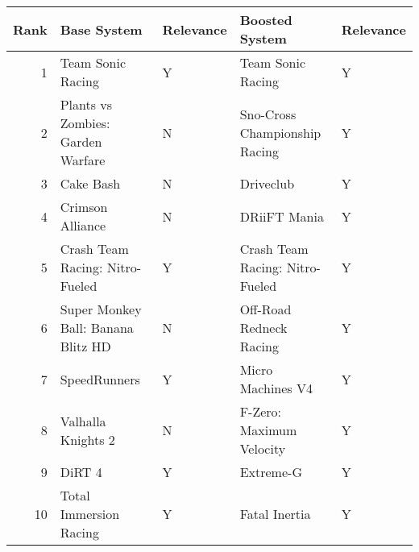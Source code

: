 \begin{tabular}{rllll}
\toprule
Rank & Base System & Relevance & Boosted System & Relevance \\
\midrule
1 & Team Sonic Racing & Y & Team Sonic Racing & Y \\
2 & Plants vs Zombies: Garden Warfare & N & Sno-Cross Championship Racing & Y \\
3 & Cake Bash & N & Driveclub & Y \\
4 & Crimson Alliance & N & DRiiFT Mania & Y \\
5 & Crash Team Racing: Nitro-Fueled & Y & Crash Team Racing: Nitro-Fueled & Y \\
6 & Super Monkey Ball: Banana Blitz HD & N & Off-Road Redneck Racing & Y \\
7 & SpeedRunners & Y & Micro Machines V4 & Y \\
8 & Valhalla Knights 2 & N & F-Zero: Maximum Velocity & Y \\
9 & DiRT 4 & Y & Extreme-G & Y \\
10 & Total Immersion Racing & Y & Fatal Inertia & Y \\
\bottomrule
\end{tabular}
